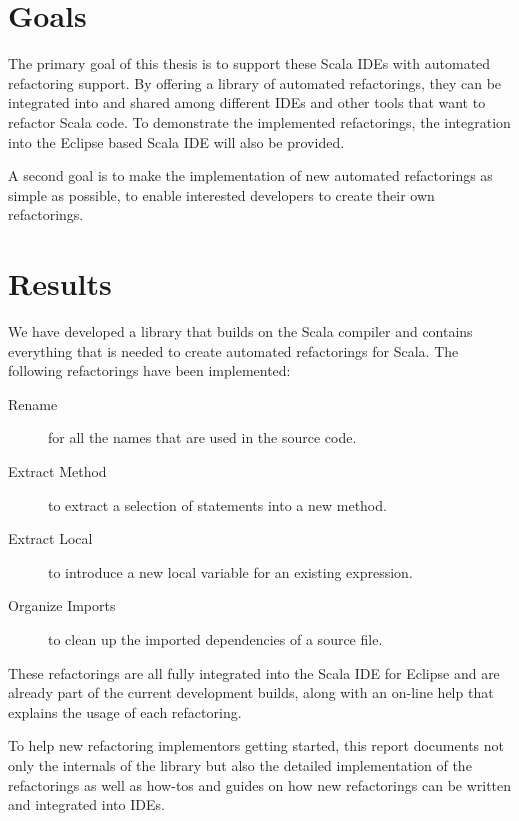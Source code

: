 \documentclass[10pt,a4paper,oneside]{scrreprt}
\begin{document}
\section*{Goals}

The primary goal of this thesis is to support these Scala IDEs with automated refactoring support. By offering a library of automated refactorings, they can be integrated into and shared among different IDEs and other tools that want to refactor Scala code. To demonstrate the implemented refactorings, the integration into the Eclipse based Scala IDE will also be provided.

A second goal is to make the implementation of new automated refactorings as simple as possible, to enable interested developers to create their own refactorings. 

\section*{Results}

We have developed a library that builds on the Scala compiler and contains everything that is needed to create automated refactorings for Scala. The following refactorings have been implemented: 

\begin{description}
  \item[Rename] for all the names that are used in the source code.
  \item[Extract Method] to extract a selection of statements into a new method.
  \item[Extract Local] to introduce a new local variable for an existing expression.
  \item[Organize Imports] to clean up the imported dependencies of a source file.
 \end{description}

These refactorings are all fully integrated into the Scala IDE for Eclipse and are already part of the current development builds, along with an on-line help that explains the usage of each refactoring.

To help new refactoring implementors getting started, this report documents not only the internals of the library but also the detailed implementation of the refactorings as well as how-tos and guides on how new refactorings can be written and integrated into IDEs.

\newpage

\setcounter{tocdepth}{2}

\tableofcontents
\end{document}

